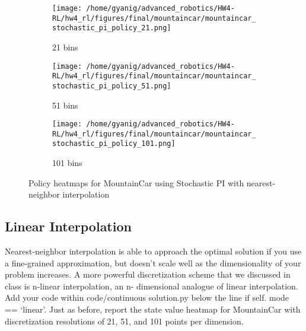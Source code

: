 \documentclass{article}
\begin{document}
\begin{figure}[H]
    \centering
    \begin{subfigure}{0.32\textwidth}
        \texttt{[image: /home/gyanig/advanced\_robotics/HW4-RL/hw4\_rl/figures/final/mountaincar/mountaincar\_stochastic\_pi\_policy\_21.png]}
        \caption{21 bins}
    \end{subfigure}
    \begin{subfigure}{0.32\textwidth}
        \texttt{[image: /home/gyanig/advanced\_robotics/HW4-RL/hw4\_rl/figures/final/mountaincar/mountaincar\_stochastic\_pi\_policy\_51.png]}
        \caption{51 bins}
    \end{subfigure}
    \begin{subfigure}{0.32\textwidth}
        \texttt{[image: /home/gyanig/advanced\_robotics/HW4-RL/hw4\_rl/figures/final/mountaincar/mountaincar\_stochastic\_pi\_policy\_101.png]}
        \caption{101 bins}
    \end{subfigure}
    \caption{Policy heatmaps for MountainCar using Stochastic PI with nearest-neighbor interpolation}
\end{figure}

\newpage

\subsection{Linear Interpolation}

Nearest-neighbor interpolation is able to approach the optimal solution if you use a fine-grained
approximation, but doesn’t scale well as the dimensionality of your problem increases. A
more powerful discretization scheme that we discussed in class is n-linear interpolation, an n-
dimensional analogue of linear interpolation. Add your code within code/continuous solution.py
below the line if self. mode == ‘linear’. Just as before, report the state value heatmap for
MountainCar with discretization resolutions of 21, 51, and 101 points per dimension.
\end{document}
